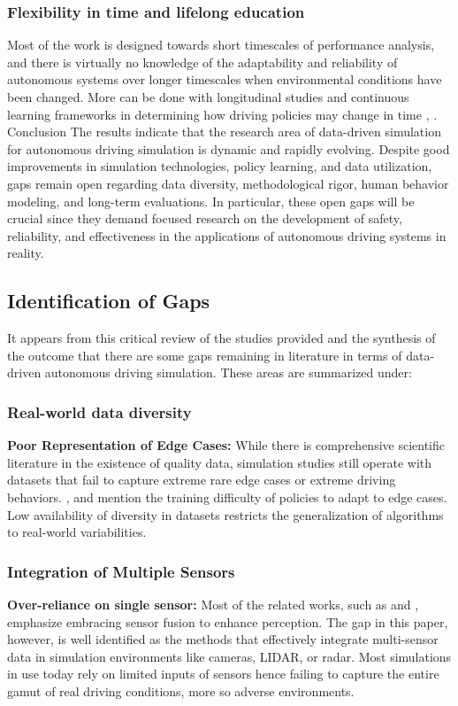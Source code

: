 \documentclass[lettersize,journal]{IEEEtran}
\begin{document}
\subsubsection{Flexibility in time and lifelong education}
Most of the work is designed towards short timescales of performance analysis, and there is virtually no knowledge of the adaptability and reliability of autonomous systems over longer timescales when environmental conditions have been changed. More can be done with longitudinal studies and continuous learning frameworks in determining how driving policies may change in time \cite{ref5}, \cite{ref10}.\\
Conclusion The results indicate that the research area of data-driven simulation for autonomous driving simulation is dynamic and rapidly evolving. Despite good improvements in simulation technologies, policy learning, and data utilization, gaps remain open regarding data diversity, methodological rigor, human behavior modeling, and long-term evaluations. In particular, these open gaps will be crucial since they demand focused research on the development of safety, reliability, and effectiveness in the applications of autonomous driving systems in reality.



\subsection{Identification of Gaps}
It appears from this critical review of the studies provided and the synthesis of the outcome that there are some gaps remaining in literature in terms of data-driven autonomous driving simulation. These areas are summarized under:

\subsubsection{Real-world data diversity}
\textbf{Poor Representation of Edge Cases:} While there is comprehensive scientific literature in the existence of quality data, simulation studies still operate with datasets that fail to capture extreme rare edge cases or extreme driving behaviors. \cite{ref2}, \cite{ref4} and \cite{ref5} mention the training difficulty of policies to adapt to edge cases. Low availability of diversity in datasets restricts the generalization of algorithms to real-world variabilities.

\subsubsection{Integration of Multiple Sensors}
\textbf{Over-reliance on single sensor:} Most of the related works, such as \cite{ref5}and \cite{ref2}, emphasize embracing sensor fusion to enhance perception. The gap in this paper, however, is well identified as the methods that effectively integrate multi-sensor data in simulation environments like cameras, LIDAR, or radar. Most simulations in use today rely on limited inputs of sensors hence failing to capture the entire gamut of real driving conditions, more so adverse environments.
\end{document}
